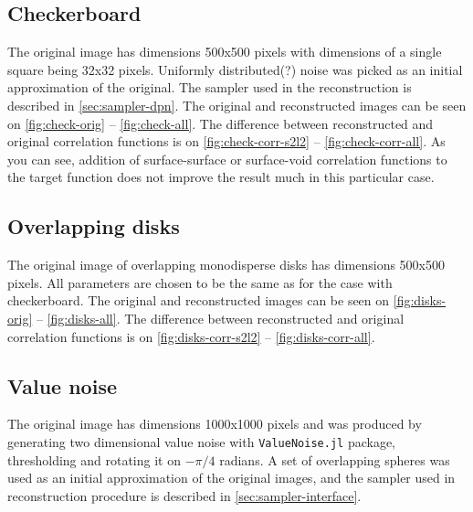 \documentclass[preprint,amsmath,amssymb,aps,pre]{revtex4-1}
\begin{document}
\subsection{Checkerboard}
The original image has dimensions 500x500 pixels with dimensions of a single
square being 32x32 pixels. Uniformly distributed(?) noise was picked as an
initial approximation of the original. The sampler used in the reconstruction is
described in \cref{sec:sampler-dpn}. The original and reconstructed images can
be seen on \cref{fig:check-orig} -- \cref{fig:check-all}. The difference between
reconstructed and original correlation functions is on
\cref{fig:check-corr-s2l2} -- \cref{fig:check-corr-all}. As you can see,
addition of surface-surface or surface-void correlation functions to the target
function does not improve the result much in this particular case.

\subsection{Overlapping disks}
The original image of overlapping monodisperse disks has dimensions 500x500
pixels. All parameters are chosen to be the same as for the case with
checkerboard. The original and reconstructed images can be seen on
\cref{fig:disks-orig} -- \cref{fig:disks-all}. The difference between
reconstructed and original correlation functions is on
\cref{fig:disks-corr-s2l2} -- \cref{fig:disks-corr-all}.

\subsection{Value noise}
The original image has dimensions 1000x1000 pixels and was produced by
generating two dimensional value noise with \verb+ValueNoise.jl+ package,
thresholding and rotating it on $-\pi/4$ radians. A set of overlapping spheres
was used as an initial approximation of the original images, and the sampler
used in reconstruction procedure is described in \cref{sec:sampler-interface}.
\end{document}
